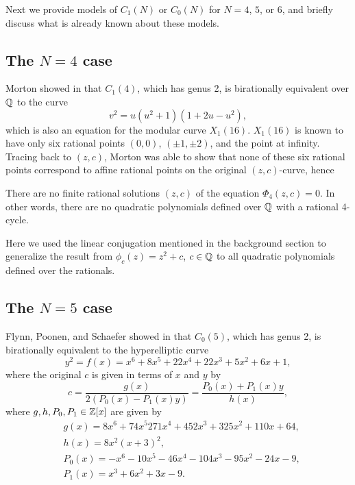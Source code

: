 Next we provide models of $C_1(N)$ or $C_0(N)$ for $N = 4$, $5$, or
$6$, and briefly discuss what is already known about these models.

\subsection{The $N = 4$ case}

Morton showed in \cite{MR1665198} that $C_1(4)$, which has genus 2, is
birationally equivalent over $\mathbb{Q}$ to the curve
\begin{equation}
  \label{eq:c1(4)}
  v^2 = u(u^2 + 1)(1 + 2u - u^2),
\end{equation}
which is also an equation for the modular curve $X_1(16)$. $X_1(16)$
is known to have only six rational points $(0, 0)$, $(\pm 1, \pm 2)$,
and the point at infinity. Tracing back to $(z, c)$, Morton was able
to show that none of these six rational points correspond to affine
rational points on the original $(z, c)$-curve, hence

\begin{theorem}
  There are no finite rational solutions $(z, c)$ of the equation
  $\Phi_4(z, c) = 0$. In other words, there are no quadratic
  polynomials defined over $\mathbb{Q}$ with a rational 4-cycle.
\end{theorem}

\begin{remark}
  Here we used the linear conjugation mentioned in the background
  section to generalize the result from $\phi_c(z) = z^2 + c$, $c \in
  \mathbb{Q}$ to all quadratic polynomials defined over the rationals.
\end{remark}

\subsection{The $N = 5$ case}

Flynn, Poonen, and Schaefer showed in \cite{MR1480542} that $C_0(5)$,
which has genus 2, is birationally equivalent to the hyperelliptic
curve
\begin{equation}
  \label{eq:c0(5)}
  y^2 = f(x) = x^6 + 8x^5 + 22x^4 + 22x^3 + 5x^2 + 6x + 1,
\end{equation}
where the original $c$ is given in terms of $x$ and $y$ by
\begin{equation}
  \label{eq:c-in-xy}
  c = \frac{g(x)}{2(P_0(x) - P_1(x) y)}
  = \frac{P_0(x) + P_1(x) y}{h(x)},
\end{equation}
where $g, h, P_0, P_1 \in \mathbb{Z}[x]$ are given by
\begin{subequations}
  \label{eq:poly-defs}
  \begin{align}
    & g(x) = 8x^6 + 74x^5 271x^4 + 452x^3 + 325x^2 + 110x + 64,\\
    & h(x) = 8x^2(x+3)^2,\\
    & P_0(x) = - x^6 - 10x^5 - 46x^4 - 104x^3 - 95x^2 - 24x - 9,\\
    & P_1(x) = x^3 + 6x^2 + 3x - 9.
  \end{align}
\end{subequations}


